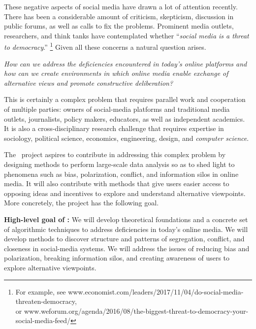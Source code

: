 \documentclass[a4paper,11pt]{article}
\begin{document}
\smallskip
These negative aspects of social media have drawn a lot of attention recently.
There has been a considerable amount of criticism, skepticism, 
discussion in public forums, as well as calls %
to fix the problems. 
Prominent media outlets, researchers, and think tanks have contemplated whether 
``{\em social media is a threat to democracy}.''%
\footnote{For example, see www.economist.com/leaders/2017/11/04/do-social-media-threaten-democracy,\\
or www.weforum.org/agenda/2016/08/the-biggest-threat-to-democracy-your-social-media-feed/}
Given all these concerns a natural question arises.

\smallskip
{\em How can we address the deficiencies encountered in today's online platforms  
and how can we create environments in which online media 
enable exchange of alternative views and promote constructive deliberation?}

\smallskip
This is certainly a complex problem that requires
parallel work and cooperation of multiple parties: 
owners of social-media platforms and
traditional media outlets, 
journalists,
policy makers, 
educators, 
as well as independent academics. 
It is also a cross-disciplinary research challenge that requires expertise in 
sociology, political science, economics, engineering, design, and {\em computer science}.

\smallskip
The \acronym\ project aspires to contribute in addressing this complex problem
by designing methods to perform large-scale data analysis so as to shed light to 
phenomena such as bias, polarization, conflict, and 
information silos in online media. 
It will also contribute with methods
that give users easier access to opposing ideas
and incentives to explore and understand alternative view\-points. 
More concretely, the project has the following goal.

\medskip
\noindent
\hspace{-3mm}\colorbox{verylightmagenta}{
\begin{minipage}{\textwidth}
{\bf High-level goal of \acronym:} 
We will develop theoretical foundations and a concrete set of algorithmic techniques 
to address deficiencies in today's online media.
We will develop methods to discover structure and patterns 
of segregation, conflict, and closeness in social-media systems.
We will address the issues of 
reducing bias and po\-lar\-iza\-tion, breaking information silos,
and creating awareness of users to explore alternative view\-points.
\end{minipage}}
\end{document}
